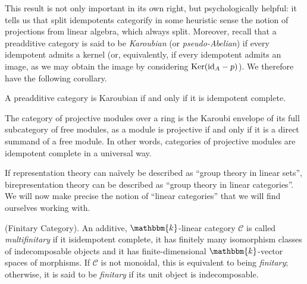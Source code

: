\noindent This result is not only important in its own right, but psychologically helpful: it tells us that split idempotents categorify in some heuristic sense the notion of projections from linear algebra, which always split. Moreover, recall that a preadditive category is said to be {\em Karoubian} (or {\em pseudo-Abelian}) if every idempotent admits a kernel (or, equivalently, if every idempotent admits an image, as we may obtain the image by considering $\textnormal{Ker}(\textnormal{id}_A - p)$). We therefore have the following corollary.\\

\noindent\begin{corollary} A preadditive category is Karoubian if and only if it is idempotent complete.\\
\end{corollary}

\noindent\begin{example} The category of projective modules over a ring is the Karoubi envelope of its full subcategory of free modules, as a module is projective if and only if it is a direct summand of a free module. In other words, categories of projective modules are idempotent complete in a universal way.\\
\end{example}

\noindent If representation theory can na\"{i}vely be described as ``group theory in linear sets'', birepresentation theory can be described as ``group theory in linear categories''. We will now make precise the notion of ``linear categories'' that we will find ourselves working with.\\

\noindent\begin{definition}\textnormal{(Finitary Category).} An additive, $\mathbbm{k}$-linear category $\mathcal{C}$ is called {\em multifinitary} if it is\linebreak idempotent complete, it has finitely many isomorphism classes of indecomposable objects and it has finite-dimensional $\mathbbm{k}$-vector spaces of morphisms. If $\mathcal{C}$ is not monoidal, this is equivalent to being {\em finitary}; otherwise, it is said to be {\em finitary} if its unit object is indecomposable.\\
\end{definition}

